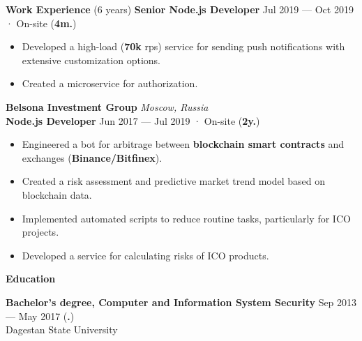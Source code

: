 \documentclass{resume}
\begin{document}
\begin{rSection}{\textbf{Work Experience} (6 years) }
\textbf{Senior Node.js Developer} \hfill Jul 2019 --- Oct 2019 · On-site ({\textbf{4m.}})
\begin{itemize}
    \item Developed a high-load (\textbf{70k} rps) service for sending push notifications with extensive customization options\@.
    \item Created a microservice for authorization\@.
\end{itemize}

\textbf{Belsona Investment Group} \hfill \textit{Moscow, Russia} \\
\textbf{Node.js Developer}  \hfill Jun 2017 --- Jul 2019 · On-site ({\textbf{2y.}})

\begin{itemize}
    \item Engineered a bot for arbitrage between \textbf{blockchain smart contracts} and exchanges (\textbf{Binance/Bitfinex})\@.
    \item Created a risk assessment and predictive market trend model based on blockchain data\@.
    \item Implemented automated scripts to reduce routine tasks, particularly for ICO projects\@.
    \item Developed a service for calculating risks of ICO products\@.
\end{itemize}

\end{rSection}



\begin{rSection}{\textbf{Education}}

\textbf{Bachelor's degree, Computer and Information System Security} \hfill {Sep 2013 --- May 2017 ({\textbf{.}})} \\
	  Dagestan State University

\end{rSection}
\end{document}
